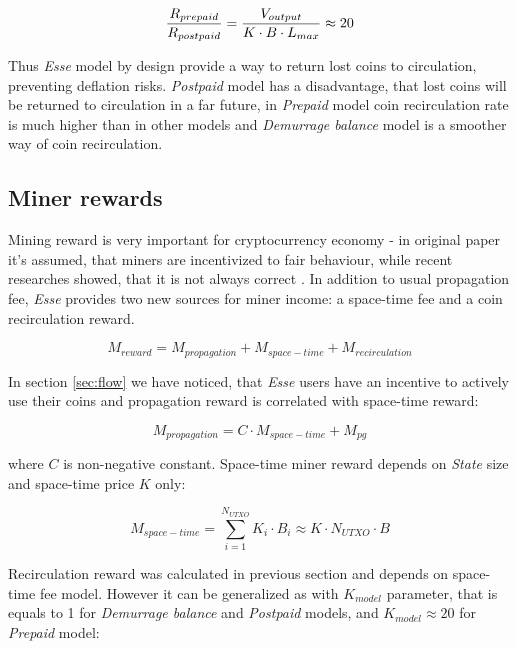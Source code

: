 \documentclass[]{article}   %
\newcommand{\esse}{\textit{Esse}}
\newcommand{\state}{\textit{State}}
\begin{document}
\begin{equation}
{R_{prepaid} \over R_{postpaid}} = { V_{output}  \over  K \cdot B \cdot L_{max}} \approx 20
\end{equation}

Thus \esse{} model by design provide a way to return lost coins to circulation, preventing deflation risks. \textit{Postpaid} model has a disadvantage, that lost coins will be returned to circulation in a far future, in \textit{Prepaid} model coin recirculation rate is much higher than in other models and \textit{Demurrage balance} model is a smoother way of coin recirculation.

\subsection{Miner rewards}
\label{minerrew}
Mining reward is very important for cryptocurrency economy - in original paper \cite{Nakamoto2008} it's assumed, that miners are incentivized to fair behaviour, while recent researches showed, that it is not always correct \cite{carlsten2016instability, eyal2014}. In addition to usual propagation fee, \esse{} provides two new sources for miner income: a space-time fee and a coin recirculation reward.

\begin{equation}
M_{reward} = M_{propagation} + M_{space-time} + M_{recirculation}
\end{equation}

In section \ref{sec:flow} we have noticed, that \esse{} users have an incentive to actively use their coins and propagation reward is correlated with space-time reward:

\begin{equation}
M_{propagation} = C \cdot M_{space-time} + M_{pg}
\end{equation}

where $C$ is non-negative constant. Space-time miner reward depends on \state{} size and space-time price $K$ only:

\begin{equation}
M_{space-time} = \sum_{i=1}^{N_{UTXO}} K_i \cdot B_i \approx K \cdot N_{UTXO} \cdot B
\end{equation}

Recirculation reward was calculated in previous section and depends on space-time fee model. However it can be generalized as with $K_{model}$ parameter, that is equals to 1 for \textit{Demurrage balance} and \textit{Postpaid} models, and $K_{model} \approx 20$ for \textit{Prepaid} model:
\end{document}
